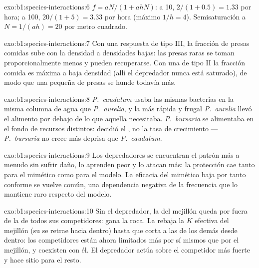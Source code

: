 \begin{solution}{exo:b1:species-interactions:6}
$f = aN/(1 + ahN)$: a 10, $2/(1 + 0.5) = 1.33$ por hora; a 100,
$20/(1 + 5) = 3.33$ por hora (máximo $1/h = 4$). Semisaturación a
$N = 1/(ah) = 20$ por metro cuadrado.
\end{solution}

\begin{solution}{exo:b1:species-interactions:7}
Con una respuesta de tipo III, la fracción de presas comidas sube con la
densidad a densidades bajas: las presas raras se toman proporcionalmente
menos y pueden recuperarse. Con una de tipo II la fracción comida es máxima
a baja densidad (allí el depredador nunca está saturado), de modo que una
 pequeña de presas se hunde todavía más.
\end{solution}

\begin{solution}{exo:b1:species-interactions:8}
\emph{P.~caudatum} usaba las mismas bacterias en la misma columna de agua
que \emph{P.~aurelia}, y la más rápida y frugal \emph{P.~aurelia} llevó el
alimento por debajo de lo que aquella necesitaba. \emph{P.~bursaria} se
alimentaba en el fondo de recursos distintos: decidió el , no la tasa
de crecimiento --- \emph{P.~bursaria} no crece más deprisa que
\emph{P.~caudatum}.
\end{solution}

\begin{solution}{exo:b1:species-interactions:9}
Los depredadores se encuentran el patrón más a menudo sin sufrir daño, lo
aprenden peor y lo atacan más: la protección cae tanto para el mimético como
para el modelo. La eficacia del mimético baja por tanto conforme se vuelve
común, una dependencia negativa de la frecuencia que lo mantiene raro
respecto del modelo.
\end{solution}

\begin{solution}{exo:b1:species-interactions:10}
Sin el depredador, la  del mejillón queda por fuera de la de todos
sus competidores: gana la roca. La  rebaja la $K$ efectiva del
mejillón (su  se retrae hacia dentro) hasta que corta a las de los
demás desde dentro: los competidores están ahora limitados más por sí mismos
que por el mejillón, y coexisten con él. El depredador actúa sobre el
competidor más fuerte y hace sitio para el resto.
\end{solution}

